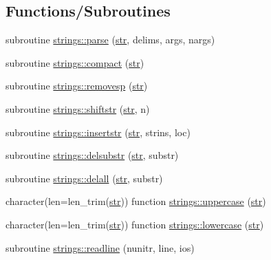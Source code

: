 \subsection*{Functions/\+Subroutines}
\begin{DoxyCompactItemize}
\item 
subroutine \hyperlink{namespacestrings_a6905131fa6e36e7e719b2f3c5f499d93}{strings\+::parse} (\hyperlink{_s_o_l_w_e_i_g__misc_8f95_a77a2ca74046c88062aa8333bf1eaca05}{str}, delims, args, nargs)
\item 
subroutine \hyperlink{namespacestrings_a31b0ac7636006c8c80397649219c6eaf}{strings\+::compact} (\hyperlink{_s_o_l_w_e_i_g__misc_8f95_a77a2ca74046c88062aa8333bf1eaca05}{str})
\item 
subroutine \hyperlink{namespacestrings_a15595b232883855ee75d1044d27694bd}{strings\+::removesp} (\hyperlink{_s_o_l_w_e_i_g__misc_8f95_a77a2ca74046c88062aa8333bf1eaca05}{str})
\item 
subroutine \hyperlink{namespacestrings_a351d6a37fa1a55733a40b8c1b0dd686e}{strings\+::shiftstr} (\hyperlink{_s_o_l_w_e_i_g__misc_8f95_a77a2ca74046c88062aa8333bf1eaca05}{str}, n)
\item 
subroutine \hyperlink{namespacestrings_a088c9da339db232b73bcb1f4da4fe5a2}{strings\+::insertstr} (\hyperlink{_s_o_l_w_e_i_g__misc_8f95_a77a2ca74046c88062aa8333bf1eaca05}{str}, strins, loc)
\item 
subroutine \hyperlink{namespacestrings_ae1241e2ce69da61233e5dd7d98418d21}{strings\+::delsubstr} (\hyperlink{_s_o_l_w_e_i_g__misc_8f95_a77a2ca74046c88062aa8333bf1eaca05}{str}, substr)
\item 
subroutine \hyperlink{namespacestrings_a453a1e27838f7417c0ea98cb36ebd9d7}{strings\+::delall} (\hyperlink{_s_o_l_w_e_i_g__misc_8f95_a77a2ca74046c88062aa8333bf1eaca05}{str}, substr)
\item 
character(len=len\+\_\+trim(\hyperlink{_s_o_l_w_e_i_g__misc_8f95_a77a2ca74046c88062aa8333bf1eaca05}{str})) function \hyperlink{namespacestrings_a9e805cff1c9339d9c7e7d10808a97e62}{strings\+::uppercase} (\hyperlink{_s_o_l_w_e_i_g__misc_8f95_a77a2ca74046c88062aa8333bf1eaca05}{str})
\item 
character(len=len\+\_\+trim(\hyperlink{_s_o_l_w_e_i_g__misc_8f95_a77a2ca74046c88062aa8333bf1eaca05}{str})) function \hyperlink{namespacestrings_ad5a1054d696063fbd4e11ad636796226}{strings\+::lowercase} (\hyperlink{_s_o_l_w_e_i_g__misc_8f95_a77a2ca74046c88062aa8333bf1eaca05}{str})
\item 
subroutine \hyperlink{namespacestrings_a6c26fe0ca9e11a3ca296f1c350f54f42}{strings\+::readline} (nunitr, line, ios)

\end{DoxyCompactItemize}
